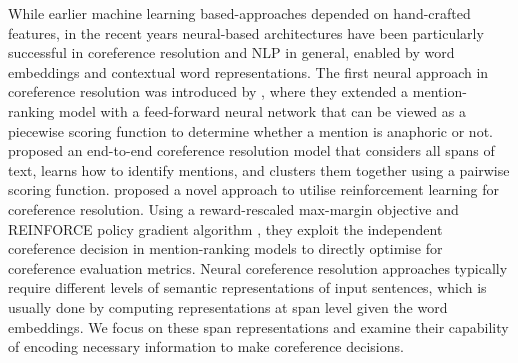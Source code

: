 \documentclass[11pt]{article}
\begin{document}
While earlier machine learning based-approaches depended on hand-crafted features, in the recent years neural-based architectures have been particularly successful in coreference resolution and NLP in general, enabled by word embeddings and contextual word representations. The first neural approach in coreference resolution was introduced by \textcite{wiseman2015learning}, where they extended a mention-ranking model with a feed-forward neural network that can be viewed as a piecewise scoring function to determine whether a mention is anaphoric or not. \textcite{lee2017end} proposed an end-to-end coreference resolution model that considers all spans of text, learns how to identify mentions, and clusters them together using a pairwise scoring function. \textcite{clark2016deep} proposed a novel approach to utilise reinforcement learning for coreference resolution. Using a reward-rescaled max-margin objective and REINFORCE policy gradient algorithm \parencite{reinforce}, they exploit the independent coreference decision in mention-ranking models to directly optimise for coreference evaluation metrics. Neural coreference resolution approaches typically require different levels of semantic representations of input sentences, which is usually done by computing representations at span level given the word embeddings. We focus on these span representations and examine their capability of encoding necessary information to make coreference decisions. 




\end{document}
